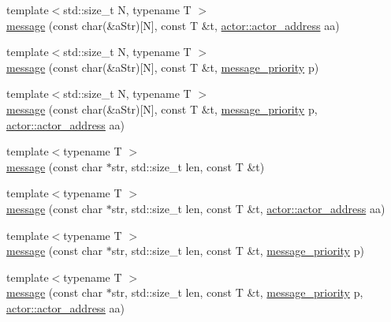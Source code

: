 \begin{DoxyCompactItemize}
{\footnotesize template$<$std\+::size\+\_\+t N, typename T $>$ }\\\hyperlink{classactor__zeta_1_1messaging_1_1message_a00398df5618923c839797568ce955d69}{message} (const char(\&a\+Str)\mbox{[}N\mbox{]}, const T \&t, \hyperlink{classactor__zeta_1_1actor_1_1actor__address}{actor\+::actor\+\_\+address} aa)
\item 
{\footnotesize template$<$std\+::size\+\_\+t N, typename T $>$ }\\\hyperlink{classactor__zeta_1_1messaging_1_1message_a0c8be6b9a9cba1a7a2142f031cdcbfbe}{message} (const char(\&a\+Str)\mbox{[}N\mbox{]}, const T \&t, \hyperlink{namespaceactor__zeta_1_1messaging_a1b4c4b3ab625eb033c15da4fbe9c4a89}{message\+\_\+priority} p)
\item 
{\footnotesize template$<$std\+::size\+\_\+t N, typename T $>$ }\\\hyperlink{classactor__zeta_1_1messaging_1_1message_abee9c14df4e91017a6f377d916409854}{message} (const char(\&a\+Str)\mbox{[}N\mbox{]}, const T \&t, \hyperlink{namespaceactor__zeta_1_1messaging_a1b4c4b3ab625eb033c15da4fbe9c4a89}{message\+\_\+priority} p, \hyperlink{classactor__zeta_1_1actor_1_1actor__address}{actor\+::actor\+\_\+address} aa)
\item 
{\footnotesize template$<$typename T $>$ }\\\hyperlink{classactor__zeta_1_1messaging_1_1message_a8caea1df1350631fa5c803e3ac368c6d}{message} (const char $\ast$str, std\+::size\+\_\+t len, const T \&t)
\item 
{\footnotesize template$<$typename T $>$ }\\\hyperlink{classactor__zeta_1_1messaging_1_1message_a1e2810d89cc8f75aa451057fe7252e07}{message} (const char $\ast$str, std\+::size\+\_\+t len, const T \&t, \hyperlink{classactor__zeta_1_1actor_1_1actor__address}{actor\+::actor\+\_\+address} aa)
\item 
{\footnotesize template$<$typename T $>$ }\\\hyperlink{classactor__zeta_1_1messaging_1_1message_a0428ac91ee6cdf4b4a99a2f7c262cc0c}{message} (const char $\ast$str, std\+::size\+\_\+t len, const T \&t, \hyperlink{namespaceactor__zeta_1_1messaging_a1b4c4b3ab625eb033c15da4fbe9c4a89}{message\+\_\+priority} p)
\item 
{\footnotesize template$<$typename T $>$ }\\\hyperlink{classactor__zeta_1_1messaging_1_1message_a145a2691247f874ab57ff964512631c1}{message} (const char $\ast$str, std\+::size\+\_\+t len, const T \&t, \hyperlink{namespaceactor__zeta_1_1messaging_a1b4c4b3ab625eb033c15da4fbe9c4a89}{message\+\_\+priority} p, \hyperlink{classactor__zeta_1_1actor_1_1actor__address}{actor\+::actor\+\_\+address} aa)

\end{DoxyCompactItemize}
